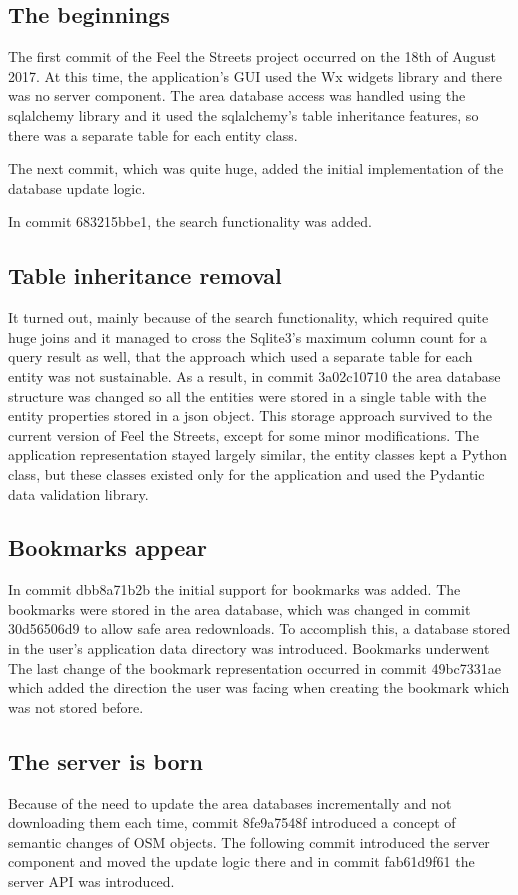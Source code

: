 \documentclass[nolof,digital]{fithesis3}
\begin{document}
\subsection{The beginnings}
The first commit of the Feel the Streets project occurred on the 18th of August 2017. At this time, the application's GUI used the Wx widgets library and there was no server component. The area database access was handled using the sqlalchemy library and it used the sqlalchemy's table inheritance features, so there was a separate table for each entity class.

The next commit, which was quite huge, added the initial implementation of the database update logic.

In commit 683215bbe1, the search functionality was added.
\subsection{Table inheritance removal}
It turned out, mainly because of the search functionality, which required quite huge joins and it managed to cross the Sqlite3's maximum column count for a query result as well, that the approach which used a separate table for each entity was not sustainable. As a result, in commit 3a02c10710 the area database structure was changed so all the entities were stored in a single table with the entity properties stored in a json object. This storage approach survived to the current version of Feel the Streets, except for some minor modifications. The application representation stayed largely similar, the entity classes kept a Python class, but these classes existed only for the application and used the Pydantic data validation library.
\subsection{Bookmarks appear}
In commit dbb8a71b2b the initial support for bookmarks was added. The bookmarks were stored in the area database, which was changed in commit 30d56506d9 to allow safe area redownloads. To accomplish this, a database stored in the user's application data directory was introduced. Bookmarks underwent The last change of the bookmark representation occurred in commit 49bc7331ae which added the direction the user was facing when creating the bookmark which was not stored before.
\subsection{The server is born}
Because of the need to update the area databases incrementally and not downloading them each time, commit 8fe9a7548f introduced a concept of semantic changes of OSM objects. The following commit introduced the server component and moved the update logic there and in commit fab61d9f61 the server API was introduced.
\end{document}
